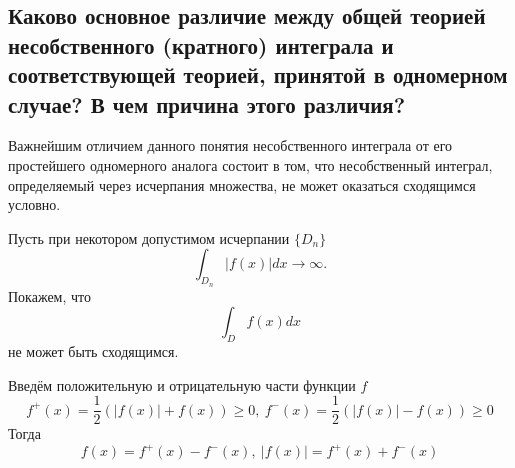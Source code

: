 
\subsection{Каково основное различие между общей теорией несобственного (кратного) интеграла и соответствующей теорией, принятой в одномерном случае? В чем причина этого различия?}
Важнейшим отличием данного понятия несобственного интеграла от его простейшего одномерного аналога состоит в том, что
несобственный интеграл, определяемый через исчерпания множества, не может оказаться сходящимся условно.

Пусть при некотором допустимом исчерпании $\{D_n\}$
\[
    \int_{D_n} |f(x)| dx \to \infty.
\]
Покажем, что 
\[
    \int_D f(x) dx
\]
не может быть сходящимся.

Введём положительную и отрицательную части функции $f$
\[f^+(x) = \frac{1}{2}(|f(x)| + f(x)) \geqslant 0, ~ f^-(x) = \frac{1}{2}(|f(x)| - f(x)) \geqslant 0\]
Тогда
\[f(x) = f^+(x) - f^-(x), ~ |f(x)| = f^+(x) + f^-(x)\]

